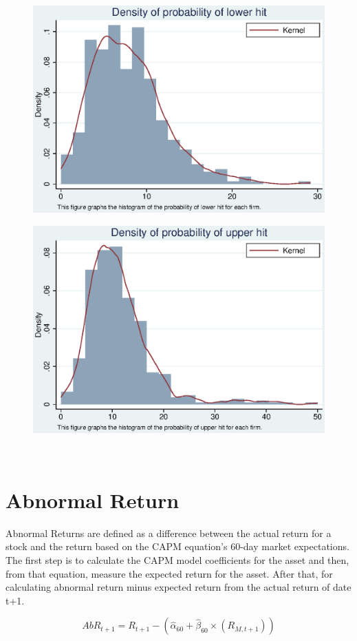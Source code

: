 \documentclass[12pt]{article}
\begin{document}
\begin{figure}[htbp]
\centering
\includegraphics[width=0.7\linewidth]{DPL.eps}
\caption{}
\label{fig:dpl}
\end{figure}
\begin{figure}[htbp]
\centering
\includegraphics[width=0.7\linewidth]{DPU.eps}
\caption{}
\label{fig:dpu}
\end{figure}

\FloatBarrier
‌ %
‌ %
\section{Abnormal Return}

Abnormal Returns are defined as a difference between the actual return for a stock and the return based on the CAPM equation's 60-day market expectations.
The first step is to calculate the CAPM model coefficients for the asset and then, from that equation, measure the expected return for the asset. 
After that, for calculating abnormal return minus expected return from the actual return of date t+1.

\begin{equation*}
AbR_{t+1} = R_{t+1} - (\hat{\alpha}_{60} + \hat{\beta}_{60} \times (R_{M,t+1}))
\end{equation*}
\end{document}
